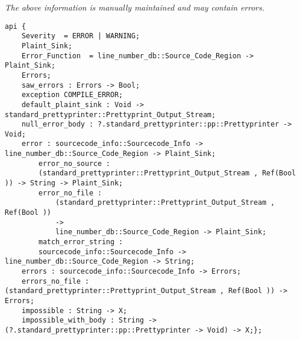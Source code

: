 \label{api:Error\_Message}

{\tiny \it The above information is manually maintained and may contain errors.}
\begin{verbatim}
api {
    Severity  = ERROR | WARNING;
    Plaint_Sink;
    Error_Function  = line_number_db::Source_Code_Region -> Plaint_Sink;
    Errors;
    saw_errors : Errors -> Bool;
    exception COMPILE_ERROR;
    default_plaint_sink : Void -> standard_prettyprinter::Prettyprint_Output_Stream;
    null_error_body : ?.standard_prettyprinter::pp::Prettyprinter -> Void;
    error : sourcecode_info::Sourcecode_Info -> line_number_db::Source_Code_Region -> Plaint_Sink;
        error_no_source :
        (standard_prettyprinter::Prettyprint_Output_Stream , Ref(Bool )) -> String -> Plaint_Sink;
        error_no_file :
            (standard_prettyprinter::Prettyprint_Output_Stream , Ref(Bool ))
            ->
            line_number_db::Source_Code_Region -> Plaint_Sink;
        match_error_string :
        sourcecode_info::Sourcecode_Info -> line_number_db::Source_Code_Region -> String;
    errors : sourcecode_info::Sourcecode_Info -> Errors;
    errors_no_file : (standard_prettyprinter::Prettyprint_Output_Stream , Ref(Bool )) -> Errors;
    impossible : String -> X;
    impossible_with_body : String -> (?.standard_prettyprinter::pp::Prettyprinter -> Void) -> X;};
\end{verbatim}
